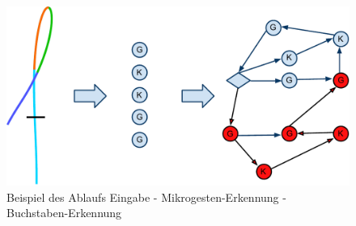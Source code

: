 \begin{figure}[h!]
  \centering
    \includegraphics[width=\textwidth]{./img/graph_ablauf_beispiel.pdf}
  \caption{Beispiel des Ablaufs Eingabe - Mikrogesten-Erkennung - Buchstaben-Erkennung}
  \label{beispiel_graph_ablauf}
\end{figure}
